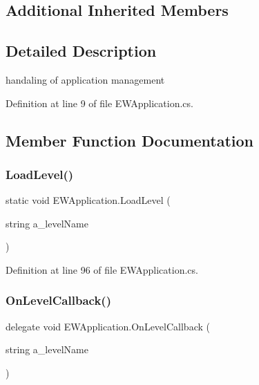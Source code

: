 \subsection*{Additional Inherited Members}


\subsection{Detailed Description}
handaling of application management 



Definition at line 9 of file E\+W\+Application.\+cs.



\subsection{Member Function Documentation}
\mbox{\label{class_e_w_application_ae8a4acbd295411a6089820b7173a9e17}} 
\subsubsection{\texorpdfstring{Load\+Level()}{LoadLevel()}}
{\footnotesize\ttfamily static void E\+W\+Application.\+Load\+Level (\begin{DoxyParamCaption}\item[{string}]{a\+\_\+level\+Name }\end{DoxyParamCaption})\hspace{0.3cm}{\ttfamily [static]}}



Definition at line 96 of file E\+W\+Application.\+cs.

\mbox{\label{class_e_w_application_a8d1ecb5cea1da7551cad3891088b67b4}} 
\subsubsection{\texorpdfstring{On\+Level\+Callback()}{OnLevelCallback()}}
{\footnotesize\ttfamily delegate void E\+W\+Application.\+On\+Level\+Callback (\begin{DoxyParamCaption}\item[{string}]{a\+\_\+level\+Name }\end{DoxyParamCaption})}

